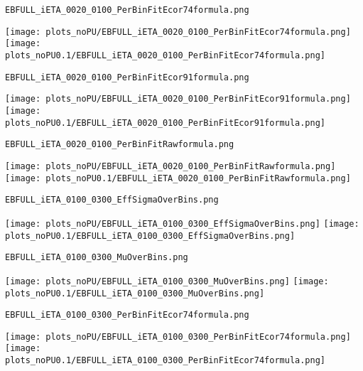 \begin{frame}[fragile]
\begin{verbatim}
EBFULL_iETA_0020_0100_PerBinFitEcor74formula.png
\end{verbatim}
\texttt{[image: plots\_noPU/EBFULL\_iETA\_0020\_0100\_PerBinFitEcor74formula.png]}
\texttt{[image: plots\_noPU0.1/EBFULL\_iETA\_0020\_0100\_PerBinFitEcor74formula.png]}
\end{frame}
\begin{frame}[fragile]
\begin{verbatim}
EBFULL_iETA_0020_0100_PerBinFitEcor91formula.png
\end{verbatim}
\texttt{[image: plots\_noPU/EBFULL\_iETA\_0020\_0100\_PerBinFitEcor91formula.png]}
\texttt{[image: plots\_noPU0.1/EBFULL\_iETA\_0020\_0100\_PerBinFitEcor91formula.png]}
\end{frame}
\begin{frame}[fragile]
\begin{verbatim}
EBFULL_iETA_0020_0100_PerBinFitRawformula.png
\end{verbatim}
\texttt{[image: plots\_noPU/EBFULL\_iETA\_0020\_0100\_PerBinFitRawformula.png]}
\texttt{[image: plots\_noPU0.1/EBFULL\_iETA\_0020\_0100\_PerBinFitRawformula.png]}
\end{frame}
\begin{frame}[fragile]
\begin{verbatim}
EBFULL_iETA_0100_0300_EffSigmaOverBins.png
\end{verbatim}
\texttt{[image: plots\_noPU/EBFULL\_iETA\_0100\_0300\_EffSigmaOverBins.png]}
\texttt{[image: plots\_noPU0.1/EBFULL\_iETA\_0100\_0300\_EffSigmaOverBins.png]}
\end{frame}
\begin{frame}[fragile]
\begin{verbatim}
EBFULL_iETA_0100_0300_MuOverBins.png
\end{verbatim}
\texttt{[image: plots\_noPU/EBFULL\_iETA\_0100\_0300\_MuOverBins.png]}
\texttt{[image: plots\_noPU0.1/EBFULL\_iETA\_0100\_0300\_MuOverBins.png]}
\end{frame}
\begin{frame}[fragile]
\begin{verbatim}
EBFULL_iETA_0100_0300_PerBinFitEcor74formula.png
\end{verbatim}
\texttt{[image: plots\_noPU/EBFULL\_iETA\_0100\_0300\_PerBinFitEcor74formula.png]}
\texttt{[image: plots\_noPU0.1/EBFULL\_iETA\_0100\_0300\_PerBinFitEcor74formula.png]}
\end{frame}

